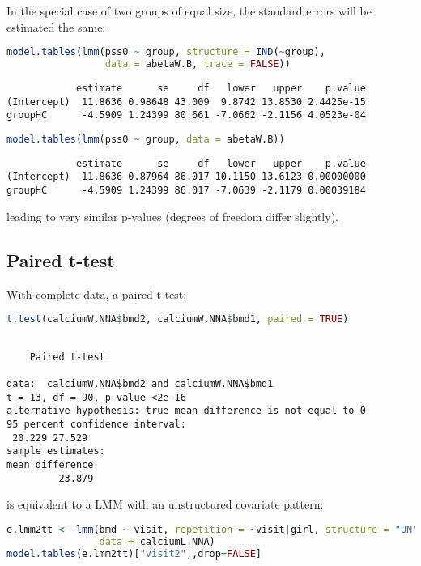 \documentclass[12pt]{article}
\begin{document}
\clearpage

In the special case of two groups of equal size, the standard errors
will be estimated the same:
\begin{lstlisting}[language=r,numbers=none]
model.tables(lmm(pss0 ~ group, structure = IND(~group), 
                 data = abetaW.B, trace = FALSE))
\end{lstlisting}

\label{}
\begin{verbatim}
            estimate      se     df   lower   upper    p.value
(Intercept)  11.8636 0.98648 43.009  9.8742 13.8530 2.4425e-15
groupHC      -4.5909 1.24399 80.661 -7.0662 -2.1156 4.0523e-04
\end{verbatim}


\begin{lstlisting}[language=r,numbers=none]
model.tables(lmm(pss0 ~ group, data = abetaW.B))
\end{lstlisting}

\label{}
\begin{verbatim}
            estimate      se     df   lower   upper    p.value
(Intercept)  11.8636 0.87964 86.017 10.1150 13.6123 0.00000000
groupHC      -4.5909 1.24399 86.017 -7.0639 -2.1179 0.00039184
\end{verbatim}


leading to very similar p-values (degrees of freedom differ slightly).

\clearpage
\subsection{Paired t-test}
\label{sec:orge351ace}

With complete data, a paired t-test:
\begin{lstlisting}[language=r,numbers=none]
t.test(calciumW.NNA$bmd2, calciumW.NNA$bmd1, paired = TRUE)
\end{lstlisting}

\label{}
\begin{verbatim}

	Paired t-test

data:  calciumW.NNA$bmd2 and calciumW.NNA$bmd1
t = 13, df = 90, p-value <2e-16
alternative hypothesis: true mean difference is not equal to 0
95 percent confidence interval:
 20.229 27.529
sample estimates:
mean difference 
         23.879
\end{verbatim}

is equivalent to a LMM with an unstructured covariate pattern:
\begin{lstlisting}[language=r,numbers=none]
e.lmm2tt <- lmm(bmd ~ visit, repetition = ~visit|girl, structure = "UN",
                data = calciumL.NNA)
model.tables(e.lmm2tt)["visit2",,drop=FALSE]
\end{lstlisting}
\end{document}
